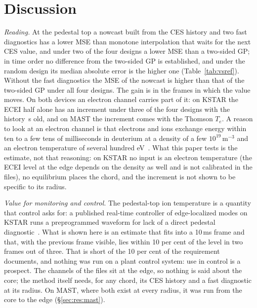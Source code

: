 \documentclass[11pt,a4paper]{article}
\newcommand{\Te}{\ensuremath{T_e}}
\begin{document}
\section{Discussion}
\label{sec:discussion}

\emph{Reading.} At the pedestal top a nowcast built from the CES history and two fast
diagnostics has a lower MSE than monotone interpolation that waits for the next CES
value, and under two of the four designs a lower MSE than a two-sided GP; in time order
no difference from the two-sided GP is established, and under the random design its
median absolute error is the higher one (Table~\ref{tab:vsref}). Without the fast
diagnostics the MSE of the nowcast is higher than that of the two-sided GP under all four
designs. The gain is in the frames in which the value moves. On both devices an
electron channel carries part of it: on KSTAR the ECEI half alone has an increment under
three of the four designs with the history \AgeMedianS\,s old, and on MAST the increment
comes with the Thomson \Te{}. A reason to look at an electron channel is that electrons
and ions exchange energy within ten to a few tens of milliseconds in deuterium at a
density of a few $10^{19}$\,m$^{-3}$ and an electron temperature of several hundred
eV~\citep{Wesson2011Tokamaks}. What this paper tests is the estimate, not that reasoning:
on KSTAR no input is an electron temperature (the ECEI level at the edge depends on the
density as well and is not calibrated in the files), no equilibrium places the chord, and
the increment is not shown to be specific to its radius.

\emph{Value for monitoring and control.} The pedestal-top ion temperature is a quantity
that control asks for: a published real-time controller of edge-localized modes on KSTAR
runs a preprogrammed waveform for lack of a direct pedestal
diagnostic~\citep{Shin2022PreemptiveDriven}. What is shown here is an estimate that
fits into a 10\,ms frame and that, with the previous frame visible, lies within 10 per
cent of the level in two frames out of three. That is short of the 10 per cent of the
requirement documents, and nothing was run on a plant control system: use in control is a
prospect. The channels of the files sit at the edge, so nothing is said about the core;
the method itself needs, for any chord, its CES history and a fast diagnostic at its
radius. On MAST, where both exist at every radius, it was run from the core to the edge
(\S\ref{sec:res:mast}).
\end{document}
